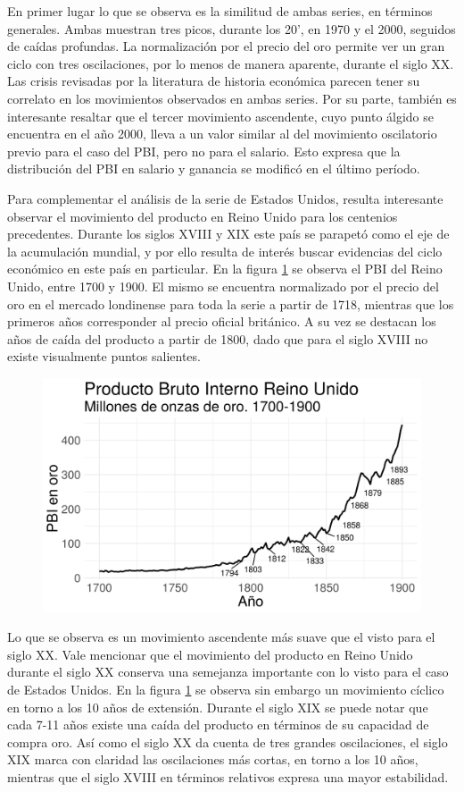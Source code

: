 \documentclass[a4paper]{article}
\begin{document}
En primer lugar lo que se observa es la similitud de ambas series, en términos generales. Ambas muestran tres picos, durante los 20', en 1970 y el 2000, seguidos de caídas profundas. La normalización por el precio del oro permite ver un gran ciclo con tres oscilaciones, por lo menos de manera aparente, durante el siglo XX. Las crisis revisadas por la literatura de historia económica parecen tener su correlato en los movimientos observados en ambas series. Por su parte, también es interesante resaltar que el tercer movimiento ascendente, cuyo punto álgido se encuentra en el año 2000, lleva a un valor similar al del movimiento oscilatorio previo para el caso del PBI, pero no para el salario. Esto expresa que la distribución del PBI en salario y ganancia se modificó en el último período. 

Para complementar el análisis de la serie de Estados Unidos, resulta interesante observar el movimiento del producto en Reino Unido para los centenios precedentes. Durante los siglos XVIII y XIX este país se parapetó como el eje de la acumulación mundial, y por ello resulta de interés buscar evidencias del ciclo económico en este país en particular. En la figura \ref{fig:uk_gdp} se observa el PBI del Reino Unido, entre 1700 y  1900. El mismo se encuentra normalizado por el precio del oro en el mercado londinense para toda la serie a partir de 1718, mientras que los primeros años corresponder al precio oficial británico. A su vez se destacan los años de caída del producto a partir de 1800, dado que para el siglo XVIII no existe visualmente puntos salientes.

\begin{figure}[H]
	\centering
	\includegraphics[width=0.75\linewidth]{uk_gdp.png}
	\caption{} \label{fig:uk_gdp}
\end{figure}

Lo que se observa es un movimiento ascendente más suave que el visto para el siglo XX. Vale mencionar que el movimiento del producto en Reino Unido durante el siglo XX conserva una semejanza importante con lo visto para el caso de Estados Unidos. En la figura \ref{fig:uk_gdp} se observa sin embargo un movimiento cíclico en torno a los 10 años de extensión. Durante el siglo XIX se puede notar que cada 7-11 años existe una caída del producto en términos de su capacidad de compra oro. Así como el siglo XX da cuenta de tres grandes oscilaciones, el siglo XIX marca con claridad las oscilaciones más cortas, en torno a los 10 años, mientras que el siglo XVIII en términos relativos expresa una mayor estabilidad. 
\end{document}
